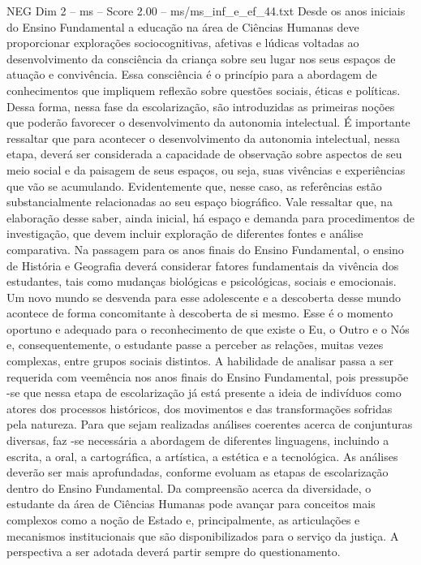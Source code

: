 \begin{textsample}{NEG Dim 2 – ms – Score 2.00 – ms/ms\_inf\_e\_ef\_44.txt}
Desde os anos iniciais do Ensino Fundamental a educação na área de Ciências Humanas deve proporcionar explorações sociocognitivas, afetivas e lúdicas voltadas ao desenvolvimento da consciência da criança sobre seu lugar nos seus espaços de atuação e convivência.
Essa consciência é o princípio para a abordagem de conhecimentos que impliquem reflexão sobre questões sociais, éticas e políticas.
Dessa forma, nessa fase da escolarização, são introduzidas as primeiras noções que poderão favorecer o desenvolvimento da autonomia intelectual.
É importante ressaltar que para acontecer o desenvolvimento da autonomia intelectual, nessa etapa, deverá ser considerada a capacidade de observação sobre aspectos de seu meio social e da paisagem de seus espaços, ou seja, suas vivências e experiências que vão se acumulando.
Evidentemente que, nesse caso, as referências estão substancialmente relacionadas ao seu espaço biográfico.
Vale ressaltar que, na elaboração desse saber, ainda inicial, há espaço e demanda para procedimentos de investigação, que devem incluir exploração de diferentes fontes e análise comparativa.
Na passagem para os anos finais do Ensino Fundamental, o ensino de História e Geografia deverá considerar fatores fundamentais da vivência dos estudantes, tais como mudanças biológicas e psicológicas, sociais e emocionais.
Um novo mundo se desvenda para esse adolescente e a descoberta desse mundo acontece de forma concomitante à descoberta de si mesmo.
Esse é o momento oportuno e adequado para o reconhecimento de que existe o Eu, o Outro e o Nós e, consequentemente, o estudante passe a perceber as relações, muitas vezes complexas, entre grupos sociais distintos.
A habilidade de analisar passa a ser requerida com veemência nos anos finais do Ensino Fundamental, pois pressupõe -se que nessa etapa de escolarização já está presente a ideia de indivíduos como atores dos processos históricos, dos movimentos e das transformações sofridas pela natureza.
Para que sejam realizadas análises coerentes acerca de conjunturas diversas, faz -se necessária a abordagem de diferentes linguagens, incluindo a escrita, a oral, a cartográfica, a artística, a estética e a tecnológica.
As análises deverão ser mais aprofundadas, conforme evoluam as etapas de escolarização dentro do Ensino Fundamental.
Da compreensão acerca da diversidade, o estudante da área de Ciências Humanas pode avançar para conceitos mais complexos como a noção de Estado e, principalmente, as articulações e mecanismos institucionais que são disponibilizados para o serviço da justiça.
A perspectiva a ser adotada deverá partir sempre do questionamento.

\end{textsample}
